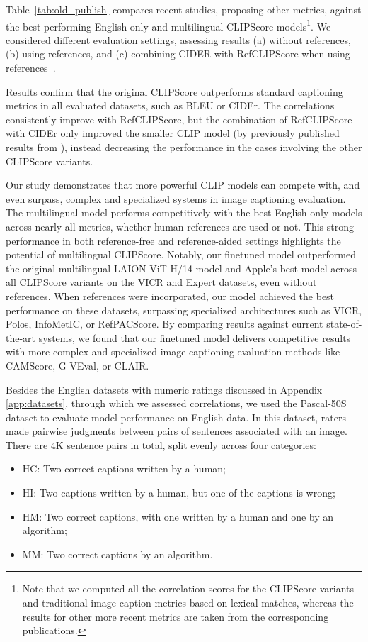 

Table~\ref{tab:old_publish} compares recent studies, proposing other metrics, against the best performing English-only and multilingual CLIPScore models\footnote{Note that we computed all the correlation scores for the CLIPScore variants and traditional image caption metrics based on lexical matches, whereas the results for other more recent metrics are taken from the corresponding publications.}. We considered different evaluation settings, assessing results (a) without references, (b) using references, and (c) combining CIDER with RefCLIPScore when using references~\cite{qiu2023gender}. 

Results confirm that the original CLIPScore outperforms standard captioning metrics in all evaluated datasets, such as BLEU or CIDEr. The correlations consistently improve with RefCLIPScore, but the combination of RefCLIPScore with CIDEr only improved the smaller CLIP model (by previously published results from \citet{qiu2023gender}), instead decreasing the performance in the cases involving the other CLIPScore variants.  

Our study demonstrates that more powerful CLIP models can compete with, and even surpass, complex and specialized systems in image captioning evaluation. The multilingual model performs competitively with the best English-only models across nearly all metrics, whether human references are used or not. This strong performance in both reference-free and reference-aided settings highlights the potential of multilingual CLIPScore. Notably, our finetuned model outperformed the original multilingual LAION ViT-H/14 model and Apple's best model across all CLIPScore variants on the VICR and Expert datasets, even without references. When references were incorporated, our model achieved the best performance on these datasets, surpassing specialized architectures such as VICR, Polos, InfoMetIC, or RefPACScore. By comparing results against current state-of-the-art systems, we found that our finetuned model delivers competitive results with more complex and specialized image captioning evaluation methods like CAMScore, G-VEval, or CLAIR. 




Besides the English datasets with numeric ratings discussed in Appendix \ref{app:datasets}, through which we assessed correlations, we used the Pascal-50S dataset \cite{vedantam2015cider} to evaluate model performance on English data. In this dataset, raters made pairwise judgments between pairs of sentences associated with an image. There are 4K sentence pairs in total, split evenly across four categories:
\begin{itemize}\setlength\itemsep{-0.3em}
    \item HC: Two correct captions written by a human; 
    \item HI: Two captions written by a human, but one of the captions is wrong; 
    \item HM: Two correct captions, with one written by a human and one by an algorithm; 
    \item MM: Two correct captions by an algorithm.
\end{itemize}

